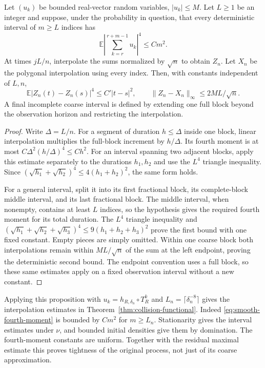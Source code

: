 \begin{proposition}
\label{prop:coarse-interpolation}
Let $(u_k)$ be bounded real-vector random variables, $|u_k|\le M$.
Let $L\ge1$ be an integer and suppose, under the probability in question,
that every deterministic interval of $m\ge L$ indices has
\[
 \mathbb E\left|\sum_{k=r}^{r+m-1}u_k\right|^4\le C m^2.
\]
At times $jL/n$, interpolate the sums normalized by $\sqrt n$ to obtain
$Z_n$. Let $X_n$ be the polygonal interpolation using every index.
Then, with constants independent of $L,n$,
\begin{equation}\label{eq:coarse-interpolation-bound}
 \mathbb E|Z_n(t)-Z_n(s)|^4\le C'|t-s|^2,
 \qquad \|Z_n-X_n\|_\infty\le 2ML/\sqrt n.
\end{equation}
A final incomplete coarse interval is defined by extending one full
block beyond the observation horizon and restricting the interpolation.
\end{proposition}
\begin{proof}
Write $\Delta=L/n$. For a segment of duration $h\le\Delta$ inside
one block, linear interpolation multiplies the full-block increment by
$h/\Delta$. Its fourth moment is at most
$C\Delta^2(h/\Delta)^4\le Ch^2$. For an interval spanning two adjacent
blocks, apply this estimate separately to the durations $h_1,h_2$ and
use the $L^4$ triangle inequality. Since
$(\sqrt{h_1}+\sqrt{h_2})^4\le4(h_1+h_2)^2$, the same form holds.

For a general interval, split it into its first fractional block, its
complete-block middle interval, and its last fractional block. The
middle interval, when nonempty, contains at least $L$ indices, so the
hypothesis gives the required fourth moment for its total duration.
The $L^4$ triangle inequality and
$(\sqrt{h_1}+\sqrt{h_2}+\sqrt{h_3})^4
 \le9(h_1+h_2+h_3)^2$
prove the first bound with one fixed constant. Empty pieces are simply
omitted. Within one coarse block both interpolations remain within
$ML/\sqrt n$ of the sum at the left endpoint, proving the deterministic
second bound. The endpoint convention uses a full block, so these same
estimates apply on a fixed observation interval without a new constant.
\end{proof}

Applying this proposition with $u_k=h_{R,\delta_n}\circ T_R^k$ and
$L_n=\lceil\delta_n^{-8}\rceil$ gives the interpolation estimates in
Theorem~\ref{thm:collision-functional}. Indeed
\eqref{eq:smooth-fourth-moment} is bounded by $Cm^2$ for $m\ge L_n$.
Stationarity gives the interval estimates under $\nu$, and bounded
initial densities give them by domination. The fourth-moment constants
are uniform. Together with the residual maximal estimate this proves
tightness of the original process, not just of its coarse approximation.

